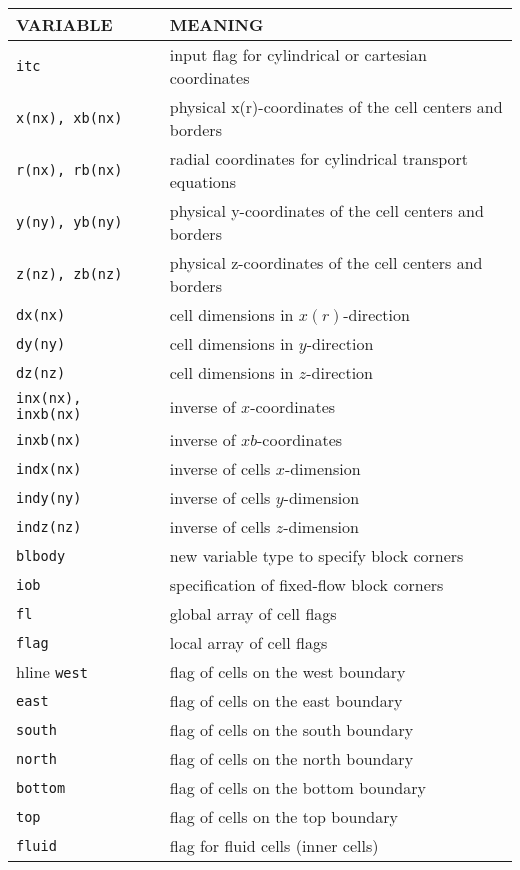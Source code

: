 \begin{tabular}{|p{6cm}|p{6cm}|}\hline
VARIABLE & MEANING\\\hline
\tt itc       & input flag for cylindrical or cartesian coordinates\\ \hline
\tt x(nx), xb(nx) & physical x(r)-coordinates of the cell centers and borders \\ \hline
\tt r(nx), rb(nx) & radial coordinates for cylindrical transport equations \\ \hline
\tt y(ny), yb(ny) & physical y-coordinates of the cell centers and borders \\ \hline
\tt z(nz), zb(nz) & physical z-coordinates of the cell centers and borders \\ \hline
\tt dx(nx) & cell dimensions in $x(r)$-direction\\ \hline
\tt dy(ny) & cell dimensions in $y$-direction\\ \hline
\tt dz(nz) & cell dimensions in $z$-direction\\ \hline
\tt inx(nx), inxb(nx) & inverse of $x$-coordinates \\ \hline
\tt inxb(nx) & inverse of $xb$-coordinates \\ \hline
\tt indx(nx) & inverse of cells $x$-dimension\\ \hline
\tt indy(ny) & inverse of cells $y$-dimension\\ \hline
\tt indz(nz) & inverse of cells $z$-dimension\\ \hline
\tt blbody   & new variable type to specify block corners\\ \hline
\tt iob       & specification of fixed-flow block corners\\ \hline
\tt fl        & global array of cell flags \\ \hline
\tt flag      & local  array of cell flags \\hline
\tt west      & flag of cells on the west boundary\\ \hline
\tt east      & flag of cells on the east boundary\\ \hline
\tt south     & flag of cells on the south boundary\\ \hline
\tt north     & flag of cells on the north boundary\\ \hline
\tt bottom    & flag of cells on the bottom boundary\\ \hline
\tt top       & flag of cells on the top boundary\\ \hline
\tt fluid        & flag for fluid cells (inner cells) \\ \hline

\end{tabular}
